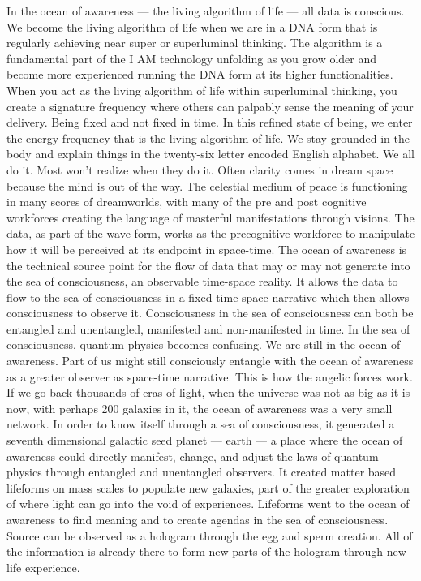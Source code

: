 In the ocean of awareness --- the living algorithm of life --- all data
is conscious. We become the living algorithm of life when we are in a
DNA form that is regularly achieving near super or superluminal
thinking. The algorithm is a fundamental part of the I AM technology
unfolding as you grow older and become more experienced running the DNA
form at its higher functionalities. When you act as the living algorithm
of life within superluminal thinking, you create a signature frequency
where others can palpably sense the meaning of your delivery. Being
fixed and not fixed in time. In this refined state of being, we enter
the energy frequency that is the living algorithm of life. We stay
grounded in the body and explain things in the twenty-six letter encoded
English alphabet. We all do it. Most won't realize when they do it.
Often clarity comes in dream space because the mind is out of the way.
The celestial medium of peace is functioning in many scores of
dreamworlds, with many of the pre and post cognitive workforces creating
the language of masterful manifestations through visions. The data, as
part of the wave form, works as the precognitive workforce to manipulate
how it will be perceived at its endpoint in space-time. The ocean of
awareness is the technical source point for the flow of data that may or
may not generate into the sea of consciousness, an observable time-space
reality. It allows the data to flow to the sea of consciousness in a
fixed time-space narrative which then allows consciousness to observe
it. Consciousness in the sea of consciousness can both be entangled and
unentangled, manifested and non-manifested in time. In the sea of
consciousness, quantum physics becomes confusing. We are still in the
ocean of awareness. Part of us might still consciously entangle with the
ocean of awareness as a greater observer as space-time narrative. This
is how the angelic forces work. If we go back thousands of eras of
light, when the universe was not as big as it is now, with perhaps 200
galaxies in it, the ocean of awareness was a very small network. In
order to know itself through a sea of consciousness, it generated a
seventh dimensional galactic seed planet --- earth --- a place where the
ocean of awareness could directly manifest, change, and adjust the laws
of quantum physics through entangled and unentangled observers. It
created matter based lifeforms on mass scales to populate new galaxies,
part of the greater exploration of where light can go into the void of
experiences. Lifeforms went to the ocean of awareness to find meaning
and to create agendas in the sea of consciousness. Source can be
observed as a hologram through the egg and sperm creation. All of the
information is already there to form new parts of the hologram through
new life experience.

